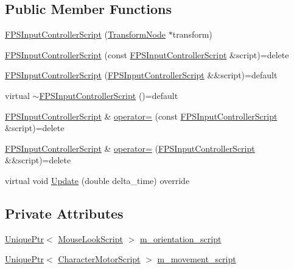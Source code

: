 \subsection*{Public Member Functions}
\begin{DoxyCompactItemize}
\item 
\hyperlink{classmage_1_1_f_p_s_input_controller_script_afb654c7011472ef300658503efaf1767}{F\+P\+S\+Input\+Controller\+Script} (\hyperlink{classmage_1_1_transform_node}{Transform\+Node} $\ast$transform)
\item 
\hyperlink{classmage_1_1_f_p_s_input_controller_script_ad47bd24645ec8a7b08c3048c92ed56fd}{F\+P\+S\+Input\+Controller\+Script} (const \hyperlink{classmage_1_1_f_p_s_input_controller_script}{F\+P\+S\+Input\+Controller\+Script} \&script)=delete
\item 
\hyperlink{classmage_1_1_f_p_s_input_controller_script_acab23879d93819b2d4ccf98c16403c36}{F\+P\+S\+Input\+Controller\+Script} (\hyperlink{classmage_1_1_f_p_s_input_controller_script}{F\+P\+S\+Input\+Controller\+Script} \&\&script)=default
\item 
virtual \hyperlink{classmage_1_1_f_p_s_input_controller_script_af01f839ac9e214003de70732988de247}{$\sim$\+F\+P\+S\+Input\+Controller\+Script} ()=default
\item 
\hyperlink{classmage_1_1_f_p_s_input_controller_script}{F\+P\+S\+Input\+Controller\+Script} \& \hyperlink{classmage_1_1_f_p_s_input_controller_script_a226a1fb2eecbd7ecdf2033a8f5460e8b}{operator=} (const \hyperlink{classmage_1_1_f_p_s_input_controller_script}{F\+P\+S\+Input\+Controller\+Script} \&script)=delete
\item 
\hyperlink{classmage_1_1_f_p_s_input_controller_script}{F\+P\+S\+Input\+Controller\+Script} \& \hyperlink{classmage_1_1_f_p_s_input_controller_script_adac34abea3d474bf8183c2555dde9034}{operator=} (\hyperlink{classmage_1_1_f_p_s_input_controller_script}{F\+P\+S\+Input\+Controller\+Script} \&\&script)=delete
\item 
virtual void \hyperlink{classmage_1_1_f_p_s_input_controller_script_ab78955a67341970a41b21ae943b81585}{Update} (double delta\+\_\+time) override
\end{DoxyCompactItemize}
\subsection*{Private Attributes}
\begin{DoxyCompactItemize}
\item 
\hyperlink{namespacemage_a8c307fbcc33bce9b7f2aa4c26c3b95cf}{Unique\+Ptr}$<$ \hyperlink{classmage_1_1_mouse_look_script}{Mouse\+Look\+Script} $>$ \hyperlink{classmage_1_1_f_p_s_input_controller_script_a22d47829d2bf8ef73d20e531b3be4165}{m\+\_\+orientation\+\_\+script}
\item 
\hyperlink{namespacemage_a8c307fbcc33bce9b7f2aa4c26c3b95cf}{Unique\+Ptr}$<$ \hyperlink{classmage_1_1_character_motor_script}{Character\+Motor\+Script} $>$ \hyperlink{classmage_1_1_f_p_s_input_controller_script_adef81e743004c4c182ceb71f9bc35ab6}{m\+\_\+movement\+\_\+script}
\end{DoxyCompactItemize}
